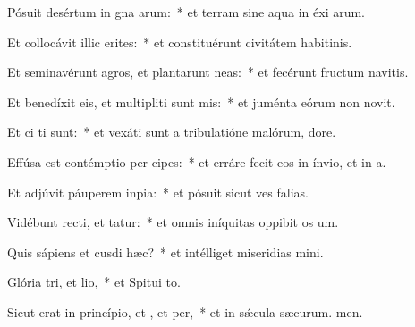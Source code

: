 \item Pósuit desértum in gna arum:~* et terram sine aqua in éxi arum.
\item Et collocávit illic erites:~* et constituérunt civitátem habitinis.
\item Et seminavérunt agros, et plantarunt neas:~* et fecérunt fructum navitis.
\item Et benedíxit eis, et multipliti sunt mis:~* et juménta eórum non novit.
\item Et ci ti sunt:~* et vexáti sunt a tribulatióne malórum,  dore.
\item Effúsa est contémptio per cipes:~* et erráre fecit eos in ínvio, et  in a.
\item Et adjúvit páuperem  inpia:~* et pósuit sicut ves falias.
\item Vidébunt recti, et tatur:~* et omnis iníquitas oppibit os um.
\item Quis sápiens et cusdi hæc?~* et intélliget miseridias mini.
\item Glória tri, et lio,~* et Spitui to.
\item Sicut erat in princípio, et , et per,~* et in sǽcula sæcurum. men.
